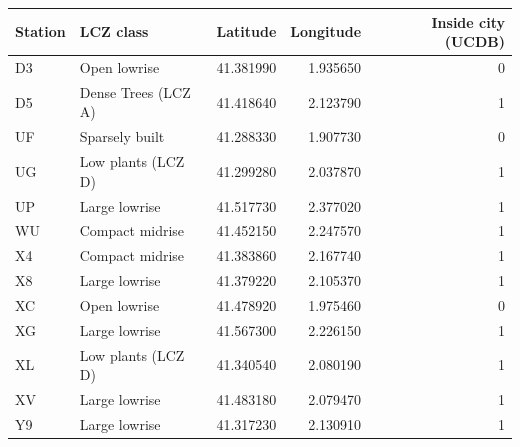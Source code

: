 \begin{tabular}{llrrr}
\toprule
Station & LCZ class & Latitude & Longitude & Inside city (UCDB) \\
\midrule
D3 & Open lowrise & 41.381990 & 1.935650 & 0 \\
D5 & Dense Trees (LCZ A) & 41.418640 & 2.123790 & 1 \\
UF & Sparsely built & 41.288330 & 1.907730 & 0 \\
UG & Low plants (LCZ D) & 41.299280 & 2.037870 & 1 \\
UP & Large lowrise & 41.517730 & 2.377020 & 1 \\
WU & Compact midrise & 41.452150 & 2.247570 & 1 \\
X4 & Compact midrise & 41.383860 & 2.167740 & 1 \\
X8 & Large lowrise & 41.379220 & 2.105370 & 1 \\
XC & Open lowrise & 41.478920 & 1.975460 & 0 \\
XG & Large lowrise & 41.567300 & 2.226150 & 1 \\
XL & Low plants (LCZ D) & 41.340540 & 2.080190 & 1 \\
XV & Large lowrise & 41.483180 & 2.079470 & 1 \\
Y9 & Large lowrise & 41.317230 & 2.130910 & 1 \\
\bottomrule
\end{tabular}
